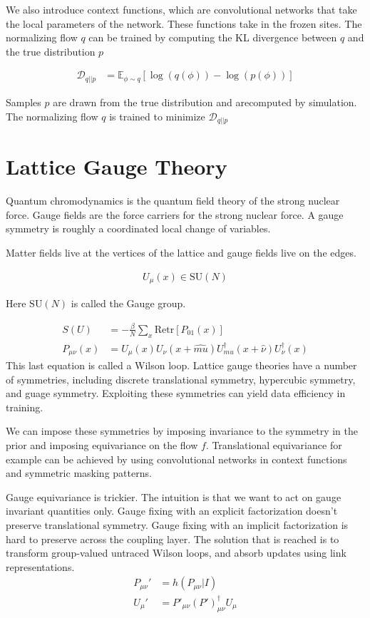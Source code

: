 \documentclass[book.tex]{subfiles}
\begin{document}
We also introduce context functions, which are convolutional networks that take the local parameters of the network. These functions take in the frozen sites. The normalizing flow $q$ can be trained by computing the KL divergence between $q$ and the true distribution $p$

\begin{align}
\mathcal{D}_{q||p} &= \mathbb{E}_{\phi \sim q}[\log(q(\phi)) - \log(p(\phi))]
\end{align}

Samples $p$ are drawn from the true distribution and arecomputed by simulation. The normalizing flow $q$ is trained to minimize $\mathcal{D}_{q||p}$

\section{Lattice Gauge Theory}

Quantum chromodynamics is the quantum field theory of the strong nuclear force. Gauge fields are the force carriers for the strong nuclear force. A gauge symmetry is roughly a coordinated local change of variables. 

Matter fields live at the vertices of the lattice and gauge fields live on the edges.

\begin{align}
U_{\mu}(x) \in \textrm{SU}(N)
\end{align} 

Here $\textrm{SU}(N)$ is called the Gauge group.

\begin{align}
    S(U) &= -\frac{\beta}{N} \sum_x \mathrm{Re}\mathrm{tr}[P_{01}(x)] \\
    P_{\mu\nu}(x) &= U_{\mu}(x)U_{\nu}(x + \hat{mu})U_{mu}^{\dagger}(x + \hat{\nu})U_{\nu}^{\dagger}(x)
\end{align}
This last equation is called a Wilson loop.
Lattice gauge theories have a number of symmetries, including discrete translational symmetry, hypercubic symmetry, and guage symmetry. Exploiting these symmetries can yield data efficiency in training.

We can impose these symmetries by imposing invariance to the symmetry in the prior and imposing equivariance on the flow $f$. Translational equivariance for example can be achieved by using convolutional networks in context functions and symmetric masking patterns. 

Gauge equivariance is trickier. The intuition is that we want to act on gauge invariant quantities only. Gauge fixing with an explicit factorization doesn't preserve translational symmetry. Gauge fixing with an implicit factorization is hard to preserve across the coupling layer. The solution that is reached is to transform group-valued untraced Wilson loops, and absorb updates using link representations.
\begin{align}
P_{\mu\nu}' &= h(P_{\mu\nu}|I) \\
U_{\mu}' &= P'_{\mu\nu}(P')_{\mu\nu}^{\dagger}U_{\mu} %
\end{align}
\end{document}
